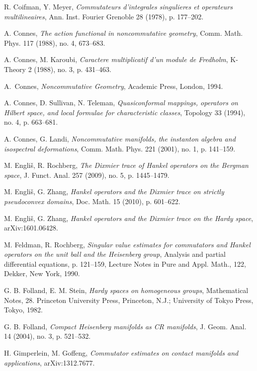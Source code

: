 \documentclass[10pt]{amsart}
\theoremstyle{remark}
\theoremstyle{definition}
\begin{document}
\begin{thebibliography}{100}
 R. Coifman, Y. Meyer, \emph{Commutateurs d'integrales singulieres et operateurs multilineaires}, Ann. Inst. Fourier Grenoble 28 (1978), p. 177--202.

 A. Connes, \emph{The  action  functional  in  noncommutative  geometry}, Comm. Math. Phys. 117 (1988), no. 4, 673--683.

 A. Connes, M. Karoubi, \emph{Caractere multiplicatif d'un module de Fredholm}, K-Theory 2 (1988), no. 3, p. 431--463.

A.~Connes, \emph{Noncommutative Geometry}, Academic Press, London, 1994.

 A. Connes, D. Sullivan, N. Teleman, \emph{Quasiconformal mappings, operators on Hilbert space, and local formulae for characteristic classes}, Topology 33 (1994), no. 4, p. 663--681.

 A. Connes, G. Landi, \emph{Noncommutative manifolds, the instanton algebra and isospectral deformations}, Comm. Math. Phys. 221 (2001), no. 1, p. 141--159. 

 M. Engli\v{s}, R. Rochberg, \emph{The Dixmier trace of Hankel operators on the Bergman space}, J. Funct. Anal. 257 (2009), no. 5, p. 1445--1479.

 M. Engli\v{s}, G. Zhang, \emph{Hankel operators and the Dixmier trace on strictly pseudoconvex domains}, Doc. Math. 15 (2010), p. 601--622.

 M. Engli\v{s}, G. Zhang, \emph{Hankel operators and the Dixmier trace on the Hardy space}, arXiv:1601.06428.

 M. Feldman, R. Rochberg, \emph{Singular value estimates for commutators and Hankel operators on the unit ball and the Heisenberg group}, Analysis and partial differential equations, p. 121--159, Lecture Notes in Pure and Appl. Math., 122, Dekker, New York, 1990. 

 G. B. Folland, E. M. Stein, \emph{Hardy spaces on homogeneous groups}, Mathematical Notes, 28. Princeton University Press, Princeton, N.J.; University of Tokyo Press, Tokyo, 1982.

 G. B. Folland, \emph{Compact Heisenberg manifolds as CR manifolds}, J. Geom. Anal. 14 (2004), no. 3, p. 521--532.

 H. Gimperlein, M. Goffeng, \emph{Commutator estimates on contact manifolds and applications}, arXiv:1312.7677.


\end{thebibliography}
\end{document}
